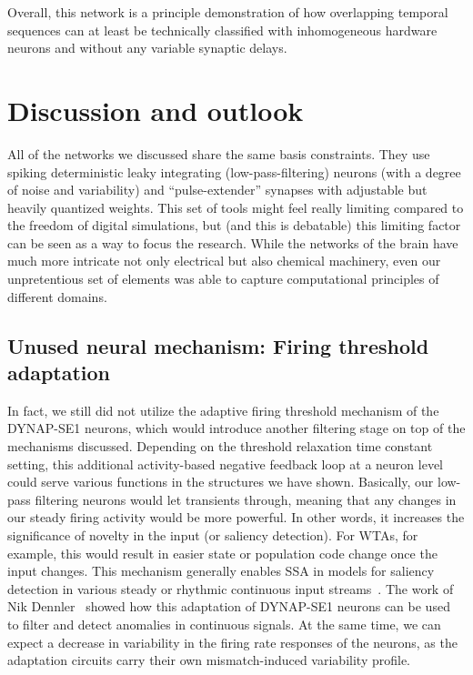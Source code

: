 Overall, this network is a principle demonstration of how overlapping temporal sequences can at least be technically classified with inhomogeneous hardware neurons and without any variable synaptic delays.


\newpage
\section{Discussion and outlook}

All of the networks we discussed share the same basis constraints. They use spiking deterministic leaky integrating (low-pass-filtering) neurons (with a degree of noise and variability) and ``pulse-extender'' synapses with adjustable but heavily quantized weights. This set of tools might feel really limiting compared to the freedom of digital simulations, but (and this is debatable) this limiting factor can be seen as a way to focus the research. While the networks of the brain have much more intricate not only electrical but also chemical machinery, even our unpretentious set of elements was able to capture computational principles of different domains.\\

\subsection{Unused neural mechanism: Firing threshold adaptation}

In fact, we still did not utilize the adaptive firing threshold mechanism of the DYNAP-SE1 neurons, which would introduce another filtering stage on top of the mechanisms discussed. Depending on the threshold relaxation time constant setting, this additional activity-based negative feedback loop at a neuron level could serve various functions in the structures we have shown. Basically, our low-pass filtering neurons would let transients through, meaning that any changes in our steady firing activity would be more powerful. In other words, it increases the significance of novelty in the input (or saliency detection). For WTAs, for example, this would result in easier state or population code change once the input changes. This mechanism generally enables \ac{SSA} in models for saliency detection in various steady or rhythmic continuous input streams~\cite{Nelken_Chechik07, Vanattou-Saifoudine_etal21}. The work of Nik Dennler~\cite{Dennler_etal21a} showed how this adaptation of DYNAP-SE1 neurons can be used to filter and detect anomalies in continuous signals.
At the same time, we can expect a decrease in variability in the firing rate responses of the neurons, as the adaptation circuits carry their own mismatch-induced variability profile.

